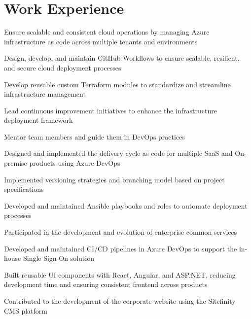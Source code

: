 \documentclass[]{deedy-resume-openfont}
\begin{document}
\section{Work Experience}
\hfill {}
\begin{tightemize}
	\item Ensure scalable and consistent cloud operations by managing Azure infrastructure as code across multiple tenants and environments
	\item Design, develop, and maintain GitHub Workflows to ensure scalable, resilient, and secure cloud deployment processes
	\item Develop reusable custom Terraform modules to standardize and streamline infrastructure management
	\item Lead continuous improvement initiatives to enhance the infrastructure deployment framework
	\item Mentor team members and guide them in DevOps practices
\end{tightemize}
\sectionsep
{}
\sectionsep
{}\hfill {}
\begin{tightemize}
	\item Designed and implemented the delivery cycle as code for multiple SaaS and On-premise products using Azure DevOps
	\item Implemented versioning strategies and branching model based on project specifications
	\item Developed and maintained Ansible playbooks and roles to automate deployment processes
\end{tightemize}
\sectionsep
{}
\sectionsep
{}\hfill {}
\begin{tightemize}
	\item Participated in the development and evolution of enterprise common services
	\item Developed and maintained CI/CD pipelines in Azure DevOps to support the in-house Single Sign-On solution
	\item Built reusable UI components with React, Angular, and ASP.NET, reducing development time and ensuring consistent frontend across products
	\item Contributed to the development of the corporate website using the Sitefinity CMS platform
\end{tightemize}
\end{document}
